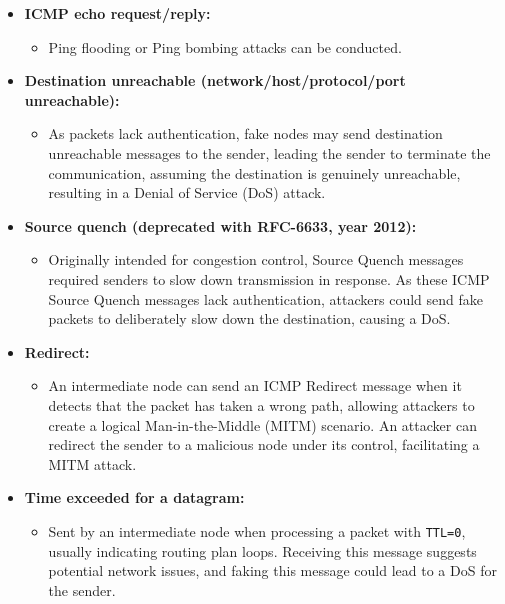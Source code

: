 \begin{itemize}
    \item \textbf{ICMP echo request/reply:}
          \begin{itemize}
              \item Ping flooding or Ping bombing attacks can be conducted.
          \end{itemize}

    \item \textbf{Destination unreachable (network/host/protocol/port unreachable):}
          \begin{itemize}
              \item As packets lack authentication, fake nodes may send destination unreachable messages to the sender, leading the sender to terminate the communication, assuming the destination is genuinely unreachable, resulting in a Denial of Service (DoS) attack.
          \end{itemize}

    \item \textbf{Source quench (deprecated with RFC-6633, year 2012):}
          \begin{itemize}
              \item Originally intended for congestion control, Source Quench messages required senders to slow down transmission in response. As these ICMP Source Quench messages lack authentication, attackers could send fake packets to deliberately slow down the destination, causing a DoS.
          \end{itemize}

    \item \textbf{Redirect:}
          \begin{itemize}
              \item An intermediate node can send an ICMP Redirect message when it detects that the packet has taken a wrong path, allowing attackers to create a logical Man-in-the-Middle (MITM) scenario. An attacker can redirect the sender to a malicious node under its control, facilitating a MITM attack.
          \end{itemize}

    \item \textbf{Time exceeded for a datagram:}
          \begin{itemize}
              \item Sent by an intermediate node when processing a packet with \texttt{TTL=0}, usually indicating routing plan loops. Receiving this message suggests potential network issues, and faking this message could lead to a DoS for the sender.
          \end{itemize}
\end{itemize}

